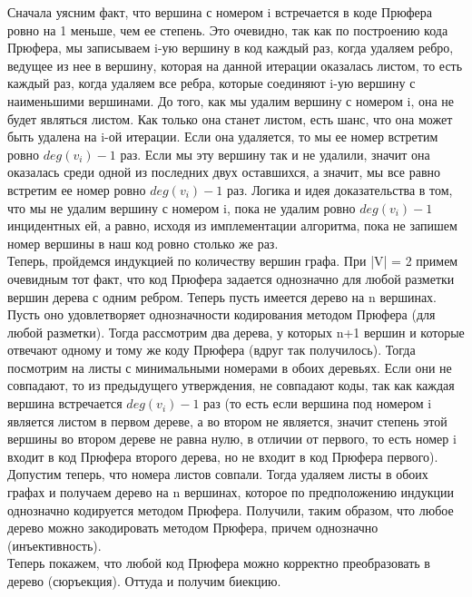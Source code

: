 \documentclass[12pt]{article}
\begin{document}
Сначала уясним факт, что вершина с номером i встречается в коде Прюфера ровно на 1 меньше, чем ее степень. Это очевидно, так как по построению кода Прюфера, мы записываем i-ую вершину в код каждый раз, когда удаляем ребро, ведущее из нее в вершину, которая на данной итерации оказалась листом, то есть каждый раз, когда удаляем все ребра, которые соединяют i-ую вершину с наименьшими вершинами. До того, как мы удалим вершину с номером i, она не будет являться листом. Как только она станет листом, есть шанс, что она может быть удалена на i-ой итерации. Если она удаляется, то мы ее номер встретим ровно \(deg(v_{i}) - 1\) раз. Если мы эту вершину так и не удалили, значит она оказалась среди одной из последних двух оставшихся, а значит, мы все равно встретим ее номер ровно \(deg(v_{i}) - 1\) раз. Логика и идея доказательства в том, что мы не удалим вершину с номером i, пока не удалим ровно \(deg(v_{i}) - 1\) инцидентных ей, а равно, исходя из имплементации алгоритма, пока не запишем номер вершины в наш код ровно столько же раз. \\

Теперь, пройдемся индукцией по количеству вершин графа. При |V| = 2 примем очевидным тот факт, что код Прюфера задается однозначно для любой разметки вершин дерева с одним ребром. Теперь пусть имеется дерево на n вершинах. Пусть оно удовлетворяет однозначности кодирования методом Прюфера (для любой разметки). Тогда рассмотрим два дерева, у которых n+1 вершин и которые отвечают одному и тому же коду Прюфера (вдруг так получилось). Тогда посмотрим на листы с минимальными номерами в обоих деревьях. Если они не совпадают, то из предыдущего утверждения, не совпадают коды, так как каждая вершина встречается \(deg(v_{i}) - 1\) раз (то есть если вершина под номером i является листом в первом дереве, а во втором не является, значит степень этой вершины во втором дереве не равна нулю, в отличии от первого, то есть номер i входит в код Прюфера второго дерева, но не входит в код Прюфера первого). Допустим теперь, что номера листов совпали. Тогда удаляем листы в обоих графах и получаем дерево на n вершинах, которое по предположению индукции однозначно кодируется методом Прюфера. Получили, таким образом, что любое дерево можно закодировать методом Прюфера, причем однозначно (инъективность). \\

Теперь покажем, что любой код Прюфера можно корректно преобразовать в дерево (сюръекция). Оттуда и получим биекцию.\\
\end{document}
